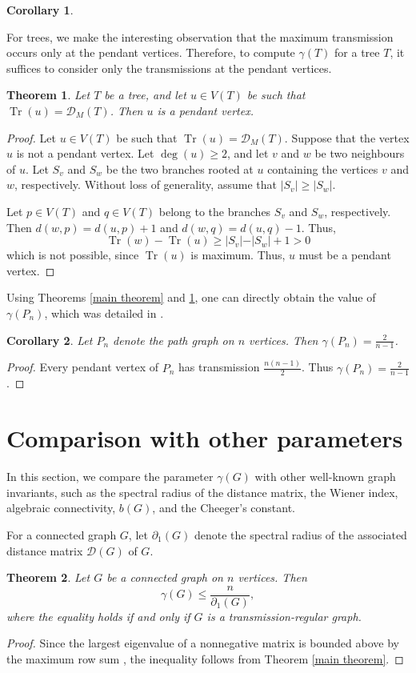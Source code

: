 \documentclass[12pt]{article}
\newtheorem{theorem}{Theorem}[section]
\newtheorem{cor}{Corollary}[section]
\DeclareMathOperator{\tr}{Tr}
\begin{document}
{{\begin{cor}
\begin{enumerate}
				\end{enumerate}
			\end{cor}
			For trees, we make the interesting observation that the maximum transmission occurs only at the pendant vertices. Therefore, to compute $\gamma(T)$ for a tree $T$, it suffices to consider only the transmissions at the pendant vertices.
			\begin{theorem} \label{pendant}
				Let $T$ be a tree, and let $u \in V(T)$ be such that $\tr(u)=\mathcal{D}_M(T)$. Then $u$ is a pendant vertex.
			\end{theorem}
			\begin{proof}
				Let $u \in V(T)$ be such that $\tr(u)=\mathcal{D}_M(T)$. Suppose that the vertex $u$ is not a pendant vertex. Let $\deg (u) \geq 2 $, and let $v$ and $w$ be two neighbours of $u$. Let $S_v$ and $S_w$ be the two branches rooted at $u$ containing the vertices $v$ and $w$, respectively. Without loss of generality,  assume that $\vert S_v \vert \geq \vert S_w \vert$.
				
				Let $p \in V(T)$ and $q \in V(T)$ belong to the branches $S_v$ and $S_w$, respectively. Then $d(w,p)=d(u,p)+1$ and $d(w,q)=d(u,q)-1$. Thus, 
				$$
				\tr(w)-\tr(u)\geq\vert S_v \vert - \vert S_w \vert+1 >0
				$$
				which is not possible, since $\tr(u)$ is maximum. Thus, $u$ must be a pendant vertex.
			\end{proof}
			Using Theorems \ref{main theorem} and \ref{pendant}, one can directly obtain the value of $\gamma(P_n)$, which was detailed in \cite{enide-geir-2024}.
			\begin{cor}
				Let $P_n$ denote the path graph on $n$ vertices. Then $\gamma(P_n)=\frac{2}{n-1}$.
			\end{cor}
			\begin{proof}
				Every pendant vertex of $P_n$ has transmission $\frac{n(n-1)}{2}$. Thus $\gamma(P_n)=\frac{2}{n-1}$. 
			\end{proof}
			\section{Comparison with other parameters}\label{compari-other}
			In this section, we compare the parameter $\gamma (G)$ with other well-known graph invariants, such as the spectral radius of the distance matrix, the Wiener index, algebraic connectivity,  $b(G)$, and the Cheeger's constant.
			
			For a connected graph $G$, let $\partial_1 (G)$ denote the spectral radius of the associated distance matrix $\mathcal{D}(G)$ of $G$.
			\begin{theorem}\label{max eigenvalue}Let $G$ be a connected graph on $n$ vertices. Then
				$$
				\gamma(G) \leq \frac{n}{\partial_1 (G)},
				$$
				where the equality holds if and only if  $G$ is a transmission-regular graph.
			\end{theorem}
			\begin{proof}
				Since the largest eigenvalue of a nonnegative matrix is bounded above by the maximum row sum \cite{matrix-analysis}, the inequality follows from Theorem \ref{main theorem}. 
				

\end{proof}}}
\end{document}
